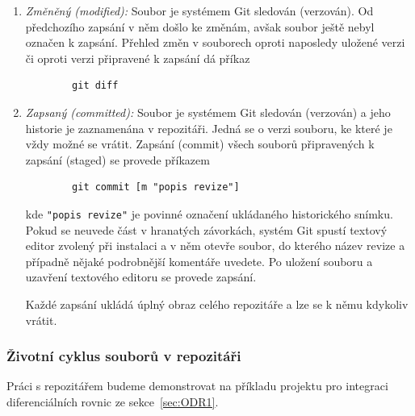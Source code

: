 \documentclass[a4paper,11pt,twoside]{article}
\def\code#1{\textnormal{\texttt{#1}}}
\theoremstyle{red}
\theoremstyle{green}
\begin{document}
\begin{enumerate}
        \item \emph{Změněný (modified):} 
            Soubor je systémem Git sledován (verzován).
            Od předchozího zapsání v něm došlo ke změnám, avšak soubor ještě nebyl označen k zapsání.
            Přehled změn v souborech oproti naposledy uložené verzi či oproti verzi připravené k zapsání dá příkaz
            \begin{lstlisting}
        git diff\end{lstlisting}
        
        \item \emph{Zapsaný (committed):} 
            Soubor je systémem Git sledován (verzován) a jeho historie je zaznamenána v repozitáři.
            Jedná se o verzi souboru, ke které je vždy možné se vrátit.
            Zapsání (commit) všech souborů připravených k zapsání (staged) se provede příkazem
            \begin{lstlisting}
        git commit [m "popis revize"]\end{lstlisting}
            kde \code{"popis revize"} je povinné označení ukládaného historického snímku.
            Pokud se neuvede část v hranatých závorkách, systém Git spustí textový editor zvolený při instalaci a v něm otevře soubor, do kterého název revize a případně nějaké podrobnější komentáře uvedete.
            Po uložení souboru a uzavření textového editoru se provede zapsání.

            Každé zapsání ukládá úplný obraz celého repozitáře a lze se k němu kdykoliv vrátit.
    \end{enumerate}

\subsubsection{Životní cyklus souborů v repozitáři}
Práci s repozitářem budeme demonstrovat na příkladu projektu pro integraci diferenciálních rovnic ze sekce~\ref{sec:ODR1}.
\end{document}
